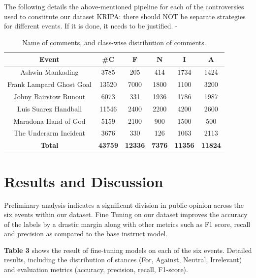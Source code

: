 \documentclass[sigconf, review]{acmart}
\begin{document}
The following details the above-mentioned pipeline for each of the controversies used to constitute our dataset {\color{red}KRIPA: there should NOT be separate strategies for different events. If it is done, it needs to be justified}. - 

\begin{table}[h]
    \centering
    \small
    {
    \begin{tabular}{|c|c|c|c|c|c|} 
        \hline
        \textbf{Event} & \textbf{\#C} & \textbf{F} & \textbf{N} & \textbf{I} & \textbf{A} \\ 
        \hline
        Ashwin Mankading  & 3785  & 205 & 414 & 1734 & 1424 \\  
        Frank Lampard Ghost Goal & 13520 & 7000 & 1800 & 1100 & 3200 \\
        Johny Bairstow Runout & 6073 & 331 & 1936 & 1786 & 1987 \\
        Luis Suarez Handball & 11546 & 2400 & 2200 & 4200 & 2600 \\
        Maradona Hand of God & 5159 & 2100 & 900 & 1500 & 500 \\
        The Underarm Incident & 3676 & 330 & 126 & 1063 & 2113 \\
        \hline
        \textbf{Total} & \textbf{43759} & \textbf{12336} & \textbf{7376} & \textbf{11356} & \textbf{11824} \\
        \hline
    \end{tabular}
    }
    \caption{Name of comments, and class-wise distribution of comments.}
    \label{tab:merged_controversies}
\end{table}

\section{Results and Discussion}\label{sec:res_discuss}

Preliminary analysis indicates a significant division in public opinion across the six events within our dataset. 
Fine Tuning on our dataset improves the accuracy of the labels by a drastic margin along with other metrics such as F1 score, recall and precision as compared to the base instruct model.

\textbf{Table 3} shows the result of fine-tuning models on each of the six events.
Detailed results, including the distribution of stances (For, Against, Neutral, Irrelevant) and evaluation metrics (accuracy, precision, recall, F1-score).
\end{document}
